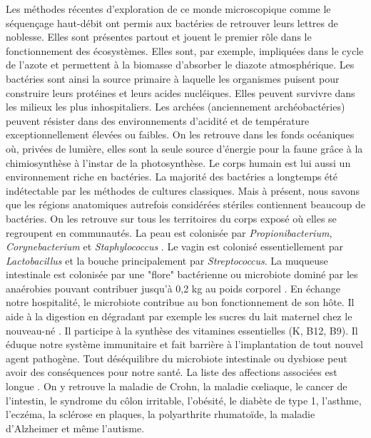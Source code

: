 \documentclass[12pt,a4paper]{article}
\begin{document}
Les méthodes récentes d'exploration de ce monde microscopique comme le séquençage haut-débit ont permis aux bactéries de retrouver leurs lettres de noblesse.
Elles sont présentes partout et jouent le premier rôle dans le fonctionnement des écosystèmes. Elles sont, par exemple, impliquées dans le cycle de l'azote et permettent à la biomasse d'absorber le diazote atmosphérique. Les bactéries sont ainsi la source primaire à laquelle les organismes puisent pour construire leurs protéines et leurs acides nucléiques.
Elles peuvent survivre dans les milieux les plus inhospitaliers. Les archées (anciennement archéobactéries) peuvent résister dans des environnements d'acidité et de température exceptionnellement élevées ou faibles. On les retrouve dans les fonds océaniques où, privées de lumière, elles sont la seule source d'énergie pour la faune grâce à la chimiosynthèse à l'instar de la photosynthèse.
Le corps humain est lui aussi un environnement riche en bactéries. La majorité des bactéries a longtemps été indétectable par les méthodes de cultures classiques. Mais à présent, nous savons que les régions anatomiques autrefois considérées stériles contiennent beaucoup de bactéries.
On les retrouve sur tous les territoires du corps exposé où elles se regroupent en communautés.
La peau est colonisée par \textit{Propionibacterium}, \textit{Corynebacterium} et \textit{Staphylococcus} \cite{Yong2017}. Le vagin est colonisé essentiellement par \textit{Lactobacillus} et la bouche principalement par \textit{Streptococcus}\cite{Yong2017}.
La muqueuse intestinale est colonisée par une "flore" bactérienne ou microbiote dominé par les anaérobies pouvant contribuer jusqu'à 0,2 kg au poids corporel \citep{Sender2016}.
En échange notre hospitalité, le microbiote contribue au bon fonctionnement de son hôte. Il aide à la digestion en dégradant par exemple les sucres du lait maternel chez le nouveau-né \cite{Bode2012,Yong2017}. Il participe à la synthèse des vitamines essentielles (K, B12, B9)\cite{LeBlanc2013,Yong2017}. Il éduque notre système immunitaire et fait barrière à l'implantation de tout nouvel agent pathogène.
Tout déséquilibre du microbiote intestinale ou dysbiose peut avoir des conséquences pour notre santé. La liste des affections associées est longue \cite{Yong2017}. On y retrouve la maladie de Crohn, la maladie cœliaque, le cancer de l’intestin, le syndrome du côlon irritable, l’obésité, le diabète de type 1, l’asthme, l’eczéma, la sclérose en plaques, la polyarthrite rhumatoïde, la maladie d’Alzheimer et même l’autisme. \\
\end{document}
